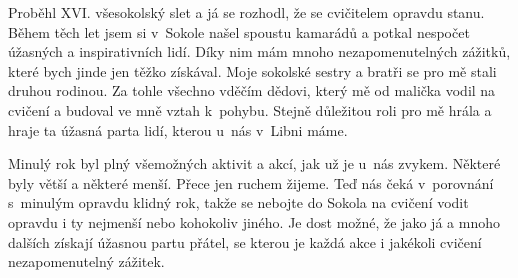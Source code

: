 \documentclass[11pt]{article}
\begin{document}
Proběhl XVI. všesokolský slet a já se rozhodl, že se cvičitelem opravdu stanu. Během těch let jsem si v~Sokole našel spoustu kamarádů a potkal nespočet úžasných a inspirativních lidí. Díky nim mám mnoho nezapomenutelných zážitků, které bych jinde jen těžko získával. Moje sokolské sestry a bratři se pro mě stali druhou rodinou. Za tohle všechno vděčím dědovi, který mě od malička vodil na cvičení a budoval ve mně vztah k~pohybu. Stejně důležitou roli pro mě hrála a hraje ta úžasná parta lidí, kterou u~nás v~Libni máme.

Minulý rok byl plný všemožných aktivit a akcí, jak už je u~nás zvykem. Některé byly větší a některé menší. Přece jen ruchem žijeme. Teď nás čeká v~porovnání s~minulým opravdu klidný rok, takže se nebojte do Sokola na cvičení vodit opravdu i ty nejmenší nebo kohokoliv jiného. Je dost možné, že jako já a mnoho dalších získají úžasnou partu přátel, se kterou je každá akce i jakékoli cvičení nezapomenutelný zážitek.

\clearpage


\pagecolor{sokolred}
\color{white}
\renewcommand{\arraystretch}{1.2}

\newcommand{\boxheight}{11.3cm}

\vspace*{\fill}
\vspace*{0pt}
\end{document}
